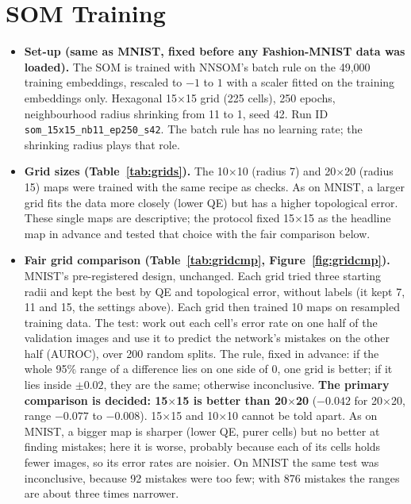 \documentclass[11pt]{article}
\begin{document}
\section{SOM Training}\label{sec:training}

\begin{itemize}[leftmargin=1.4em, itemsep=2pt]
\item \textbf{Set-up (same as MNIST, fixed before any Fashion-MNIST data was loaded).} The SOM is trained with NNSOM's batch rule \cite{jafari_nnsom} on the 49,000 training embeddings, rescaled to $-1$ to $1$ with a scaler fitted on the training embeddings only. Hexagonal 15$\times$15 grid (225 cells), 250 epochs, neighbourhood radius shrinking from 11 to 1, seed 42. Run ID \texttt{som\_15x15\_nb11\_ep250\_s42}. The batch rule has no learning rate; the shrinking radius plays that role.

\item \textbf{Grid sizes (Table~\ref{tab:grids}).} The 10$\times$10 (radius 7) and 20$\times$20 (radius 15) maps were trained with the same recipe as checks. As on MNIST, a larger grid fits the data more closely (lower QE) but has a higher topological error. These single maps are descriptive; the protocol fixed 15$\times$15 as the headline map in advance and tested that choice with the fair comparison below.

\item \textbf{Fair grid comparison (Table~\ref{tab:gridcmp}, Figure~\ref{fig:gridcmp}).} MNIST's pre-registered design, unchanged. Each grid tried three starting radii and kept the best by QE and topological error, without labels (it kept 7, 11 and 15, the settings above). Each grid then trained 10 maps on resampled training data. The test: work out each cell's error rate on one half of the validation images and use it to predict the network's mistakes on the other half (AUROC), over 200 random splits. The rule, fixed in advance: if the whole 95\% range of a difference lies on one side of 0, one grid is better; if it lies inside $\pm0.02$, they are the same; otherwise inconclusive. \textbf{The primary comparison is decided: 15$\times$15 is better than 20$\times$20} ($-0.042$ for 20$\times$20, range $-0.077$ to $-0.008$). 15$\times$15 and 10$\times$10 cannot be told apart. As on MNIST, a bigger map is sharper (lower QE, purer cells) but no better at finding mistakes; here it is worse, probably because each of its cells holds fewer images, so its error rates are noisier. On MNIST the same test was inconclusive, because 92 mistakes were too few; with 876 mistakes the ranges are about three times narrower.


\end{itemize}
\end{document}
